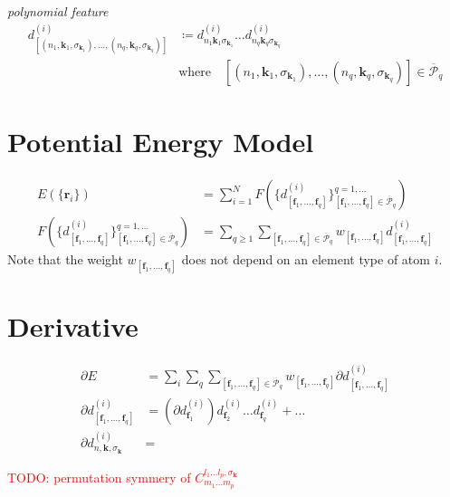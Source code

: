 \documentclass[a4paper, 11pt]{article}
\theoremstyle{definition}
\newcommand{\term}[1]{\textit{#1}}
\newcommand{\todo}[1]{\textcolor{red}{TODO: #1}}
\begin{document}
\term{polynomial feature}
\begin{align}
  d^{(i)}_{[(n_{1}, \mathbf{k}_{1}, \sigma_{\mathbf{k}_{1}}), \dots, (n_{q}, \mathbf{k}_{q}, \sigma_{\mathbf{k}_{q}})]}
  &\coloneqq d^{(i)}_{ n_{1} \mathbf{k}_{1} \sigma_{\mathbf{k}_{1}} } \dots d^{(i)}_{ n_{q} \mathbf{k}_{q} \sigma_{\mathbf{k}_{q}} } \nonumber \\
  &\mbox{where} \quad
    [(n_{1}, \mathbf{k}_{1}, \sigma_{\mathbf{k}_{1}}), \dots, (n_{q}, \mathbf{k}_{q}, \sigma_{\mathbf{k}_{q}})] \in \overline{\mathcal{P}}_{q}
\end{align}


\section{Potential Energy Model}

\begin{align}
  E(\{ \mathbf{r}_{i} \}) &= \sum_{i=1}^{N} F \left( \{ d^{(i)}_{ [\mathbf{f}_{1}, \dots, \mathbf{f}_{q}] } \}_{[\mathbf{f}_{1}, \dots, \mathbf{f}_{q}] \in \overline{\mathcal{P}}_{q}}^{q=1,\dots} \right) \\
  F \left( \{ d^{(i)}_{ [\mathbf{f}_{1}, \dots, \mathbf{f}_{q}] } \}_{[\mathbf{f}_{1}, \dots, \mathbf{f}_{q}] \in \overline{\mathcal{P}}_{q}}^{q=1,\dots} \right)
  &= \sum_{q \geq 1} \sum_{ [\mathbf{f}_{1}, \dots, \mathbf{f}_{q}] \in \overline{\mathcal{P}}_{q} } w_{ [\mathbf{f}_{1}, \dots, \mathbf{f}_{q}] } d^{(i)}_{ [\mathbf{f}_{1}, \dots, \mathbf{f}_{q}] }
\end{align}
Note that the weight $w_{ [\mathbf{f}_{1}, \dots, \mathbf{f}_{q}] }$ does not depend on an element type of atom $i$.

\section{Derivative}

\begin{align}
  \partial E
  &= \sum_{i} \sum_{q} \sum_{ [\mathbf{f}_{1}, \dots, \mathbf{f}_{q}] \in \overline{\mathcal{P}}_{q} }
        w_{ [\mathbf{f}_{1}, \dots, \mathbf{f}_{q}] } \partial d^{(i)}_{ [\mathbf{f}_{1}, \dots, \mathbf{f}_{q}] } \\
  \partial d^{(i)}_{ [\mathbf{f}_{1}, \dots, \mathbf{f}_{q}] }
  &= \left( \partial d^{(i)}_{\mathbf{f}_{1}} \right) d^{(i)}_{\mathbf{f}_{2}} \dots d^{(i)}_{\mathbf{f}_{q}} + \dots \\
  \partial d^{(i)}_{n, \mathbf{k}, \sigma_{\mathbf{k}}}
  &=
\end{align}

\todo{permutation symmery of $ C^{l_{1} \dots l_{p}, \sigma_{\mathbf{k}} }_{m_{1} \dots m_{p}} $}

% 
% 
\end{document}
